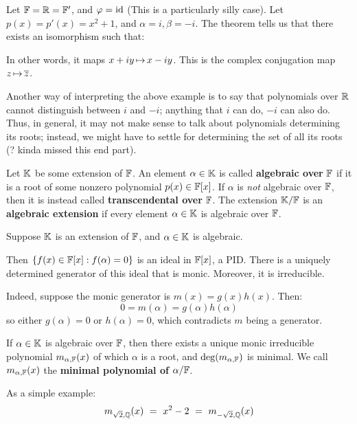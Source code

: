 \begin{xmp}[source=Primary Source Material]
    Let $ \mathbb{F} = \mathbb{R} = \mathbb{F}' $, and $ \operatorname{\varphi} = \textrm{id} $
    (This is a particularly silly case).
    Let $ p(x) = p'(x) = x^{2} + 1 $, and $ \alpha = i, \beta = -i $.
    The theorem tells us that there exists an isomorphism such that:
    
    \centering
    \flushleft
    
    In other words, it maps $ x + iy \operatorname{\mapsto} x - iy $.
    This is the complex conjugation map $ z \operatorname{\mapsto} \overline{z} $.
\end{xmp}
Another way of interpreting the above example is to say that polynomials over
$ \mathbb{R} $ cannot distinguish between $ i $ and $ -i $; anything that $ i $ can
do, $ -i $ can also do. Thus, in general, it may not make sense to talk about
polynomials determining its roots; instead, we might have to settle for
determining the set of all its roots (? kinda missed this end part).

\begin{defn}
    Let $ \mathbb{K} $ be some extension of $ \mathbb{F} $. \vsp
    An element $ \alpha \in \mathbb{K} $ is called \textbf{algebraic over} $ \mathbb{F} $
    if it is a root of some nonzero polynomial $ p(x) \in \mathbb{F}[x] $. \vsp
    If $ \alpha $ is \textit{not} algebraic over $ \mathbb{F} $, then it is instead
    called \textbf{transcendental over} $ \mathbb{F} $. \vsp
    The extension $ \mathbb{K}/\mathbb{F} $ is an \textbf{algebraic extension} if every
    element $ \alpha \in \mathbb{K} $ is algebraic over $ \mathbb{F} $.
\end{defn}

Suppose $ \mathbb{K} $ is an extension of $ \mathbb{F} $, and $ \alpha \in \mathbb{K} $ is
algebraic.

Then $ \left\{{f(x) \in \mathbb{F}[x] : f(\alpha) = 0}\right\} $ is an ideal in $ \mathbb{F}[x] $,
a PID. There is a uniquely determined generator of this ideal that is monic.
Moreover, it is irreducible.

Indeed, suppose the monic generator is $ m(x) = g(x)h(x) $. Then:
\begin{equation*}
    0 = m(\alpha) = g(\alpha)h(\alpha)
\end{equation*}
so either $ g(\alpha) = 0 $ or $ h(\alpha) = 0 $, which contradicts $ m $ being
a generator.

\begin{defn}
    If $ \alpha \in \mathbb{K} $ is algebraic over $ \mathbb{F} $, then there exists a
    unique monic irreducible polynomial $ m_{\alpha, \mathbb{F}}(x) $ of which
    $ \alpha $ is a root, and $ \deg(m_{\alpha, \mathbb{F}}) $ is minimal.
    We call $ m_{\alpha, \mathbb{F}}(x) $ the \textbf{minimal polynomial of}
    $ \alpha/\mathbb{F} $.
\end{defn}
As a simple example:
\begin{equation*}
    m_{\sqrt{2}, \mathbb{Q}}(x) \ = \ x^{2} - 2 \ = \ m_{-\sqrt{2},\mathbb{Q}}(x)
\end{equation*}

